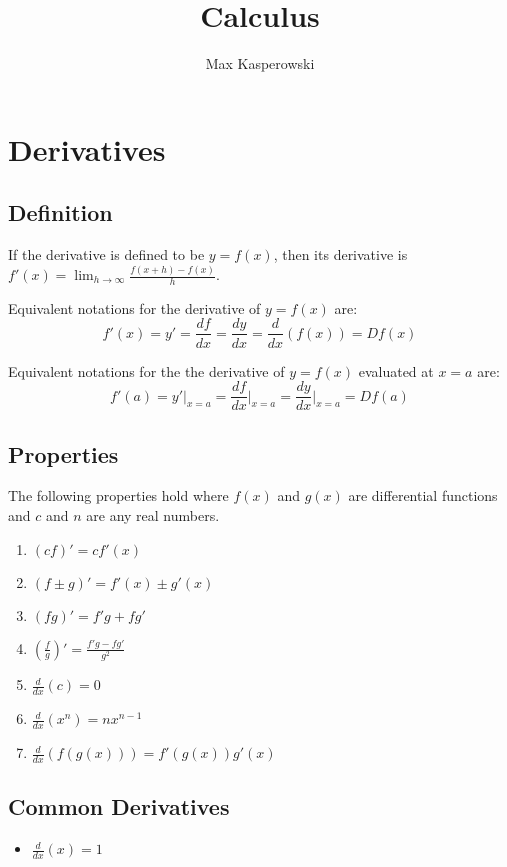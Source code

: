 \documentclass[a4paper, 10pt]{article}
\title{Calculus}
\author{Max Kasperowski}
\begin{document}
\maketitle
\tableofcontents

\newpage
\section{Derivatives}
\subsection{Definition}

If the derivative is defined to be \( y = f(x) \), then its derivative is \( f'(x) = \lim_{h\to\infty}\frac{f(x+h)-f(x)}{h} \).
\newline

Equivalent notations for the derivative of \( y = f(x) \) are:
\[ f'(x) = y' = \frac{df}{dx} = \frac{dy}{dx} = \frac{d}{dx}(f(x)) = Df(x) \]
\newline

Equivalent notations for the the derivative of \( y = f(x) \) evaluated at \( x = a \) are:
\[ f'(a) = y'\Bigr|_{x=a} = \frac{df}{dx}\Bigr|_{x=a} = \frac{dy}{dx}\Bigr|_{x=a} = Df(a) \]

\subsection{Properties}
The following properties hold where \( f(x) \) and \( g(x) \) are differential functions and \( c \) and \( n \) are any real numbers.

\begin{multicols}{2}
    \begin{enumerate}
        \item \( (cf)' = cf'(x) \)
        \item \( (f \pm g)' = f'(x) \pm g'(x) \)
        \item \( (fg)' = f'g + fg' \)
        \item \( \left(\frac{f}{g}\right)' = \frac{f'g - fg'}{g^2} \)
        \item \( \frac{d}{dx}(c) = 0 \)
        \item \( \frac{d}{dx}\left(x^n\right) = nx^{n-1} \)
        \item \( \frac{d}{dx}\left(f\left(g(x)\right)\right) = f'\left(g(x)\right)g'(x) \)
    \end{enumerate}
\end{multicols}
\subsection{Common Derivatives}
\begin{multicols}{3}
    \begin{itemize}
        \item[] \( \frac{d}{dx}(x) = 1 \)
    \end{itemize}
\end{multicols}
\end{document}
